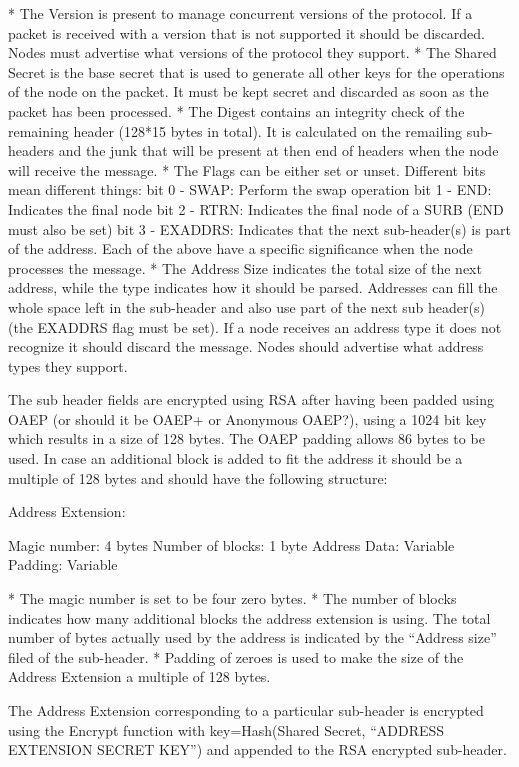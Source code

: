 * The Version is present to manage concurrent versions of the
protocol. If a packet is received with a version that is not supported
it should be discarded. Nodes must advertise what versions of the
protocol they support.
* The Shared Secret is the base secret that is used to generate all
other keys for the operations of the node on the packet. It must be
kept secret and discarded as soon as the packet has been processed. 
* The Digest contains an integrity check of the remaining header (128*15
bytes in total). It is calculated on the remailing sub-headers and the
junk that will be present at then end of headers when the node will
receive the message. 
* The Flags can be either set or unset. Different bits mean different
things: 
bit 0 - SWAP: Perform the swap operation
bit 1 - END:  Indicates the final node
bit 2 - RTRN: Indicates the final node of a SURB (END must also be set)
bit 3 - EXADDRS: Indicates that the next sub-header(s) is part of the
address. 
Each of the above have a specific significance when the node processes
the message. 
* The Address Size indicates the total size of the next address, while
the type indicates how it should be parsed. Addresses can fill the
whole space left in the sub-header and also use part of the next sub
header(s) (the EXADDRS flag must be set). If a node receives an address
type it does not recognize it should discard the message. Nodes should
advertise what address types they support.

The sub header fields are encrypted using RSA after having been padded
using OAEP (or should it be OAEP+ or Anonymous OAEP?), using a 1024
bit key which results in a size of 128 bytes. The OAEP padding allows
86 bytes to be used. In case an additional block is added to fit the
address it should be a multiple of 128 bytes and should have the
following structure:
 
Address Extension:

Magic number:     4 bytes
Number of blocks: 1 byte
Address Data:     Variable
Padding:          Variable

* The magic number is set to be four zero bytes.
* The number of blocks indicates how many additional blocks the address
extension is using. The total number of bytes actually used by the
address is indicated by the ``Address size'' filed of the sub-header.  
* Padding of zeroes is used to make the size of the Address Extension a
multiple of 128 bytes.  

The Address Extension corresponding to a particular sub-header is
encrypted using the Encrypt function with key=Hash(Shared Secret,
``ADDRESS EXTENSION SECRET KEY'') and appended to the RSA encrypted
sub-header.

